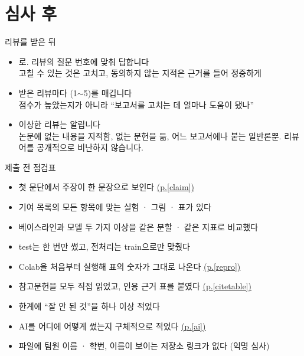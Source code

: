 \documentclass[aspectratio=169,11pt,t]{beamer}
\newcommand{\pref}[1]{\hyperlink{#1}{\textcolor{ksagolddk}{(p.\ref{#1})}}}
\begin{document}
\section{심사 후}
\begin{frame}{리뷰를 받은 뒤}
\vfill
\begin{itemize}
\setlength\itemsep{1em}
\item {}로. 리뷰의 질문 번호에 맞춰 답합니다\\
{\small 고칠 수 있는 것은 고치고, 동의하지 않는 지적은 근거를 들어 정중하게}
\item 받은 리뷰마다  (1$\sim$5)를 매깁니다\\
{\small 점수가 높았는지가 아니라 ``보고서를 고치는 데 얼마나 도움이 됐나''}
\item 이상한 리뷰는  알립니다\\
{\small 논문에 없는 내용을 지적함, 없는 문헌을 듦, 어느 보고서에나 붙는 일반론뿐. 리뷰어를 공개적으로 비난하지 않습니다.}
\end{itemize}
\vfill
{}
\end{frame}

\begin{frame}{제출 전 점검표}
\vfill
\begin{itemize}
\setlength\itemsep{0.35em}
\item[$\square$] 첫 문단에서 주장이 한 문장으로 보인다 \pref{claim}
\item[$\square$] 기여 목록의 모든 항목에 맞는 실험 · 그림 · 표가 있다
\item[$\square$] 베이스라인과 모델 두 가지 이상을 같은 분할 · 같은 지표로 비교했다
\item[$\square$] test는 한 번만 썼고, 전처리는 train으로만 맞췄다
\item[$\square$] Colab을 처음부터 실행해 표의 숫자가 그대로 나온다 \pref{repro}
\item[$\square$] 참고문헌을 모두 직접 읽었고, 인용 근거 표를 붙였다 \pref{citetable}
\item[$\square$] 한계에 ``잘 안 된 것''을 하나 이상 적었다
\item[$\square$] AI를 어디에 어떻게 썼는지 구체적으로 적었다 \pref{ai}
\item[$\square$] 파일에 팀원 이름 · 학번, 이름이 보이는 저장소 링크가 없다 (익명 심사)
\end{itemize}
\vfill
{}
\end{frame}
\end{document}
